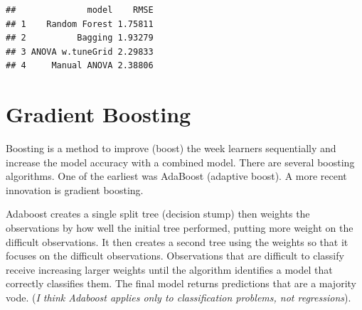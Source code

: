 \documentclass[
]{book}
\newenvironment{Shaded}{\begin{snugshade}}{\end{snugshade}}
\newcommand{\DataTypeTok}[1]{\textcolor[rgb]{0.13,0.29,0.53}{#1}}
\newcommand{\DecValTok}[1]{\textcolor[rgb]{0.00,0.00,0.81}{#1}}
\newcommand{\KeywordTok}[1]{\textcolor[rgb]{0.13,0.29,0.53}{\textbf{#1}}}
\newcommand{\NormalTok}[1]{#1}
\newcommand{\OperatorTok}[1]{\textcolor[rgb]{0.81,0.36,0.00}{\textbf{#1}}}
\newcommand{\StringTok}[1]{\textcolor[rgb]{0.31,0.60,0.02}{#1}}
\begin{document}
\begin{Shaded}
\end{Shaded}

\begin{verbatim}
##              model    RMSE
## 1    Random Forest 1.75811
## 2          Bagging 1.93279
## 3 ANOVA w.tuneGrid 2.29833
## 4     Manual ANOVA 2.38806
\end{verbatim}

\hypertarget{gradient-boosting}{%
\section{Gradient Boosting}\label{gradient-boosting}}

Boosting is a method to improve (boost) the week learners sequentially and increase the model accuracy with a combined model. There are several boosting algorithms. One of the earliest was AdaBoost (adaptive boost). A more recent innovation is gradient boosting.

Adaboost creates a single split tree (decision stump) then weights the observations by how well the initial tree performed, putting more weight on the difficult observations. It then creates a second tree using the weights so that it focuses on the difficult observations. Observations that are difficult to classify receive increasing larger weights until the algorithm identifies a model that correctly classifies them. The final model returns predictions that are a majority vode. (\emph{I think Adaboost applies only to classification problems, not regressions}).
\end{document}
